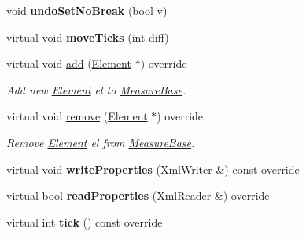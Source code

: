 \begin{DoxyCompactItemize}
void {\bfseries undo\+Set\+No\+Break} (bool v)
\item 
\mbox{\label{class_ms_1_1_measure_base_a3565507f2dab807ad37d4ab9d3c09cbc}} 
virtual void {\bfseries move\+Ticks} (int diff)
\item 
\mbox{\label{class_ms_1_1_measure_base_ae90f898c7019348602aa6f77154c443f}} 
virtual void \hyperlink{class_ms_1_1_measure_base_ae90f898c7019348602aa6f77154c443f}{add} (\hyperlink{class_ms_1_1_element}{Element} $\ast$) override
\begin{DoxyCompactList}\small\item\em Add new \hyperlink{class_ms_1_1_element}{Element} {\itshape el} to \hyperlink{class_ms_1_1_measure_base}{Measure\+Base}. \end{DoxyCompactList}\item 
\mbox{\label{class_ms_1_1_measure_base_afe73bb904bd65e8241677f7f5d5976f4}} 
virtual void \hyperlink{class_ms_1_1_measure_base_afe73bb904bd65e8241677f7f5d5976f4}{remove} (\hyperlink{class_ms_1_1_element}{Element} $\ast$) override
\begin{DoxyCompactList}\small\item\em Remove \hyperlink{class_ms_1_1_element}{Element} {\itshape el} from \hyperlink{class_ms_1_1_measure_base}{Measure\+Base}. \end{DoxyCompactList}\item 
\mbox{\label{class_ms_1_1_measure_base_a1f6496f9e9631851af40be8ed190573b}} 
virtual void {\bfseries write\+Properties} (\hyperlink{class_ms_1_1_xml_writer}{Xml\+Writer} \&) const override
\item 
\mbox{\label{class_ms_1_1_measure_base_a91e933c3e23dd23451f08520bd60d5c1}} 
virtual bool {\bfseries read\+Properties} (\hyperlink{class_ms_1_1_xml_reader}{Xml\+Reader} \&) override
\item 
\mbox{\label{class_ms_1_1_measure_base_abf905c18e56a6c99821e9114f91e975d}} 
virtual int {\bfseries tick} () const override
\item 
\mbox{\label{class_ms_1_1_measure_base_a0ad0c45fc721184cc1df902232719fc2}} 

\end{DoxyCompactItemize}
